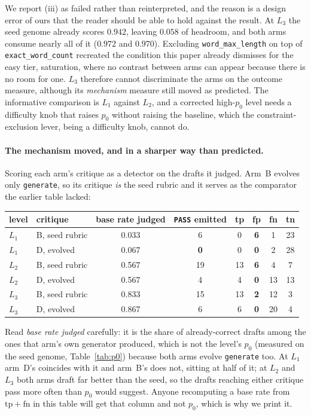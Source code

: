 \documentclass[11pt]{article}
\begin{document}
We report (iii) as failed rather than reinterpreted, and the reason is a design error of ours
that the reader should be able to hold against the result. At $L_3$ the seed genome already
scores $0.942$, leaving $0.058$ of headroom, and both arms consume nearly all of it ($0.972$ and
$0.970$). Excluding \texttt{word\_max\_length} on top of \texttt{exact\_word\_count} recreated the condition this paper already dismisses for the easy tier, saturation, where no
contrast between arms can appear because there is no room for one. $L_3$ therefore cannot
discriminate the arms on the outcome measure, although its \emph{mechanism} measure still moved
as predicted. The informative comparison is $L_1$ against $L_2$, and a corrected high-$p_0$
level needs a difficulty knob that raises $p_0$ without raising the baseline, which the
constraint-exclusion lever, being a difficulty knob, cannot do.

\paragraph{The mechanism moved, and in a sharper way than predicted.} Scoring each arm's
critique as a detector on the drafts it judged. Arm~B evolves only \texttt{generate},
so its critique \emph{is} the seed rubric and it serves as the comparator the earlier table
lacked:

\begin{center}\small
\begin{tabular}{llcccccc}
\toprule
level & critique & base rate judged & \texttt{PASS} emitted & tp & \textbf{fp} & fn & tn \\
\midrule
$L_1$ & B, seed rubric   & 0.033 & 6  & 0  & \textbf{6} & 1  & 23 \\
$L_1$ & D, evolved       & 0.067 & \textbf{0}  & 0  & \textbf{0} & 2  & 28 \\
$L_2$ & B, seed rubric   & 0.567 & 19 & 13 & \textbf{6} & 4  & 7 \\
$L_2$ & D, evolved       & 0.567 & 4  & 4  & \textbf{0} & 13 & 13 \\
$L_3$ & B, seed rubric   & 0.833 & 15 & 13 & \textbf{2} & 12 & 3 \\
$L_3$ & D, evolved       & 0.867 & 6  & 6  & \textbf{0} & 20 & 4 \\
\bottomrule
\end{tabular}
\end{center}

Read \emph{base rate judged} carefully: it is the share of already-correct drafts among the
ones that arm's own generator produced, which is not the level's $p_0$ (measured on the seed
genome, Table~\ref{tab:p0}) because both arms evolve \texttt{generate} too. At $L_1$ arm~D's
coincides with it and arm~B's does not, sitting at half of it; at $L_2$ and $L_3$ both arms draft
far better than the seed, so the drafts reaching either critique pass more often than $p_0$ would
suggest. Anyone recomputing a base rate from
$\mathrm{tp}+\mathrm{fn}$ in this table will get that column and not $p_0$, which is why we print it.
\end{document}
